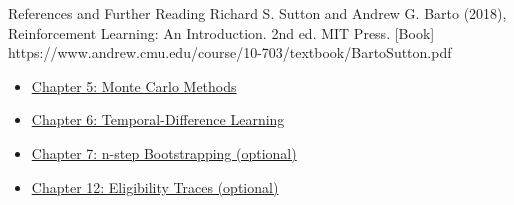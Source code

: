 \begin{frame}{References and Further Reading}
  {Richard S. Sutton and Andrew G. Barto (2018), Reinforcement Learning: An Introduction. 2nd ed. MIT Press. [Book]}
  {https://www.andrew.cmu.edu/course/10-703/textbook/BartoSutton.pdf}
  {\begin{itemize}
\item \href{https://www.andrew.cmu.edu/course/10-703/textbook/BartoSutton.pdf\#page=113}{Chapter 5: Monte Carlo Methods}
\item \href{https://www.andrew.cmu.edu/course/10-703/textbook/BartoSutton.pdf\#page=141}{Chapter 6: Temporal-Difference Learning}
\item \href{https://www.andrew.cmu.edu/course/10-703/textbook/BartoSutton.pdf\#page=163}{Chapter 7: n-step Bootstrapping (optional)}
\item \href{https://www.andrew.cmu.edu/course/10-703/textbook/BartoSutton.pdf\#page=309}{Chapter 12: Eligibility Traces (optional)}
\end{itemize}}
\end{frame}

